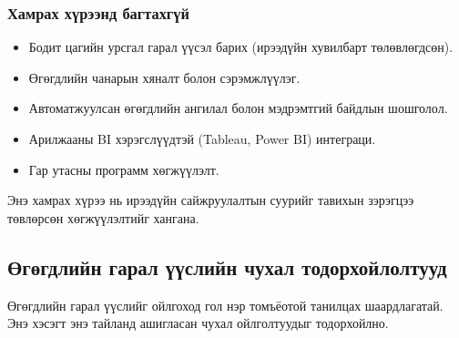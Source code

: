 \subsubsection{Хамрах хүрээнд багтахгүй}

\begin{itemize}
    \item Бодит цагийн урсгал гарал үүсэл барих (ирээдүйн хувилбарт төлөвлөгдсөн).
    \item Өгөгдлийн чанарын хяналт болон сэрэмжлүүлэг.
    \item Автоматжуулсан өгөгдлийн ангилал болон мэдрэмтгий байдлын шошголол.
    \item Арилжааны BI хэрэгслүүдтэй (Tableau, Power BI) интеграци.
    \item Гар утасны программ хөгжүүлэлт.
\end{itemize}

Энэ хамрах хүрээ нь ирээдүйн сайжруулалтын суурийг тавихын зэрэгцээ төвлөрсөн хөгжүүлэлтийг хангана.

\subsection{Өгөгдлийн гарал үүслийн чухал тодорхойлолтууд}
\label{subsec:dl_definitions}

Өгөгдлийн гарал үүслийг ойлгоход гол нэр томъёотой танилцах шаардлагатай. Энэ хэсэгт энэ тайланд ашигласан чухал ойлголтуудыг тодорхойлно.

